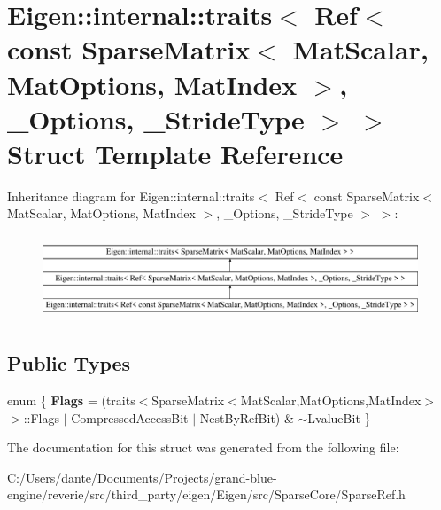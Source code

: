 \hypertarget{struct_eigen_1_1internal_1_1traits_3_01_ref_3_01const_01_sparse_matrix_3_01_mat_scalar_00_01_mat06d17b3f87cceb06f00332b993332271}{}\section{Eigen\+::internal\+::traits$<$ Ref$<$ const Sparse\+Matrix$<$ Mat\+Scalar, Mat\+Options, Mat\+Index $>$, \+\_\+\+Options, \+\_\+\+Stride\+Type $>$ $>$ Struct Template Reference}
\label{struct_eigen_1_1internal_1_1traits_3_01_ref_3_01const_01_sparse_matrix_3_01_mat_scalar_00_01_mat06d17b3f87cceb06f00332b993332271}
Inheritance diagram for Eigen\+::internal\+::traits$<$ Ref$<$ const Sparse\+Matrix$<$ Mat\+Scalar, Mat\+Options, Mat\+Index $>$, \+\_\+\+Options, \+\_\+\+Stride\+Type $>$ $>$\+:\begin{figure}[H]
\begin{center}
\leavevmode
\includegraphics[height=2.541604cm]{struct_eigen_1_1internal_1_1traits_3_01_ref_3_01const_01_sparse_matrix_3_01_mat_scalar_00_01_mat06d17b3f87cceb06f00332b993332271}
\end{center}
\end{figure}
\subsection*{Public Types}
\begin{DoxyCompactItemize}
\item 
\mbox{\label{struct_eigen_1_1internal_1_1traits_3_01_ref_3_01const_01_sparse_matrix_3_01_mat_scalar_00_01_mat06d17b3f87cceb06f00332b993332271_a2139f92ff5806df9b60b0466edcc1329}} 
enum \{ {\bfseries Flags} = (traits$<$Sparse\+Matrix$<$Mat\+Scalar,Mat\+Options,Mat\+Index$>$ $>$\+::Flags $\vert$ Compressed\+Access\+Bit $\vert$ Nest\+By\+Ref\+Bit) \& $\sim$\+Lvalue\+Bit
 \}
\end{DoxyCompactItemize}


The documentation for this struct was generated from the following file\+:\begin{DoxyCompactItemize}
\item 
C\+:/\+Users/dante/\+Documents/\+Projects/grand-\/blue-\/engine/reverie/src/third\+\_\+party/eigen/\+Eigen/src/\+Sparse\+Core/Sparse\+Ref.\+h\end{DoxyCompactItemize}
